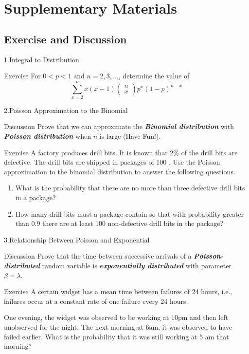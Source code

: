 \documentclass{beamer}
\newcommand{\bb}[1]{\textcolor{antiquefuchsia}{\textbf{\textit{#1}}}}
\begin{document}
\section{Supplementary Materials}
\subsection{Exercise and Discussion}
\begin{frame}{1.Integral to Distribution}
\begin{block}{Exercise}
For $0<p<1$ and $n=2,3, \ldots$, determine the value of
$$
\sum_{x=2}^{n} x(x-1)\left(\begin{array}{l}
n \\
x
\end{array}\right) p^{x}(1-p)^{n-x}
$$
\end{block}
\end{frame}

\begin{frame}{2.Poisson Approximation to the Binomial}
\begin{block}{Discussion}
Prove that we can approximate the \bb{Binomial distribution} with \bb{Poisson distribution} when $n$ is large (Have Fun!).
\end{block}
\begin{block}{Exercise}
A factory produces drill bits. It is known that $2 \%$ of the drill bits are defective. The drill bits are shipped in packages of 100 . Use the Poisson approximation to the binomial distribution to answer the following questions.
\begin{enumerate}
\item What is the probability that there are no more than three defective drill bits in a package?
\item How many drill bits must a package contain so that with probability greater than $0.9$ there are at least 100 non-defective drill bits in the package?
\end{enumerate}
\end{block}
\end{frame}

\begin{frame}{3.Relationship Between Poisson and Exponential}
\begin{block}{Discussion}
Prove that the time between successive arrivals of a \bb{Poisson-distributed} random variable is \bb{exponentially distributed} with parameter $\beta=\lambda$.
\end{block}
\begin{block}{Exercise}
A certain widget has a mean time between failures of 24 hours, i.e., failures occur at a constant rate of one failure every 24 hours.

One evening, the widget was observed to be working at $10 \mathrm{pm}$ and then left unobserved for the night. The next morning at $6 \mathrm{am}$, it was observed to have failed earlier. What is the probability that it was still working at 5 am that morning?
\end{block}
\end{frame}
\end{document}
